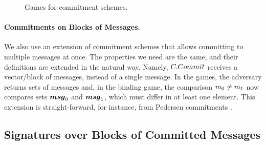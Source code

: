 \begin{figure}[ht!]
  \begin{minipage}[t]{0.5\textwidth}
  \end{minipage}
  \begin{minipage}[t]{0.5\textwidth}
  \end{minipage}
  \label{fig:com-games}
  \caption{Games for commitment schemes.}
\end{figure}

\paragraph{Commitments on Blocks of Messages.} We also use an extension
of commitment schemes that allows committing to multiple messages at once. The
properties we need are the same, and their definitions are extended in the
natural way. Namely, $C.Commit$ receives a vector/block of messages, \msgset
instead of a single message. In the games, the adversary returns sets of
messages and, in the binding game, the comparison $m_0 \neq m_1$ now
compares sets $\boldsymbol{msg}_0$ and $\boldsymbol{msg}_1$, which must differ in at least one
element. This extension is straight-forward, for instance, from Pedersen
commitments \cite{bcc+15}.

\subsection{Signatures over Blocks of Committed Messages}
\label{sapp:sbcm}


